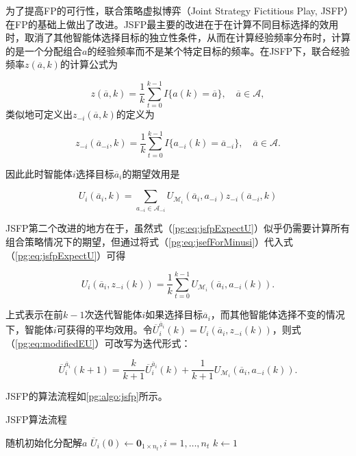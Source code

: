 为了提高FP的可行性，联合策略虚拟博弈（Joint Strategy Fictitious Play, JSFP）在FP的基础上做出了改进。JSFP最主要的改进在于在计算不同目标选择的效用时，取消了其他智能体选择目标的独立性条件，从而在计算经验频率分布时，计算的是一个分配组合$a$的经验频率而不是某个特定目标的频率。在JSFP下，联合经验频率$z(\overline a,k)$的计算公式为

\begin{equation}
\label{pg:eq:jsef}
	z(\overline a,k) = \frac{1}{k} \sum_{t=0}^{k-1} I\{a(k) = \overline a\},\quad \overline a \in \mathcal{A},
\end{equation}
类似地可定义出$z_{-i}(\overline a,k)$的定义为

\begin{equation}
\label{pg:eq:jsefForMinusi}
	z_{-i}(\overline a_{-i},k) = \frac{1}{k} \sum_{t=0}^{k-1} I\{a_{-i}(k) = \overline a_{-i}\},\quad \overline a \in \mathcal{A}.
\end{equation}

因此此时智能体$i$选择目标$\overline a_i$的期望效用是

\begin{equation}
\label{pg:eq:jsfpExpectU}
	U_i(\overline a_i,k) = \sum_{a_{-i} \in \mathcal{A}_{-i}} U_{\mathcal{M}_i}(\overline a_i,a_{-i}) z_{-i}(\overline a_{-i},k)
\end{equation}

JSFP第二个改进的地方在于，虽然式（\ref{pg:eq:jsfpExpectU}）似乎仍需要计算所有组合策略情况下的期望，但通过将式（\ref{pg:eq:jsefForMinusi}）代入式（\ref{pg:eq:jsfpExpectU}）可得

\begin{equation}
\label{pg:eq:modifiedEU}
	U_i(\overline a_i, z_{-i}(k)) = \frac{1}{k}\sum_{t=0}^{k-1} U_{\mathcal{M}_i}(\overline a_i, a_{-i}(k)).
\end{equation}

上式表示在前$k-1$次迭代智能体$i$如果选择目标$\overline a_i$，而其他智能体选择不变的情况下，智能体$i$可获得的平均效用。令$\overline U_i^{\overline a_i}(k)=U_i(\overline a_i, z_{-i}(k))$，则式（\ref{pg:eq:modifiedEU}）可改写为迭代形式：

\begin{equation}
\label{pg:eq:recurJSFP}
	\overline U_i^{\overline a_i}(k+1) = \frac{k}{k+1} \overline U_i^{\overline a_i}(k) + \frac{1}{k+1} U_{\mathcal{M}_i}(\overline a_i, a_{-i}(k)).
\end{equation}

JSFP的算法流程如\ref{pg:algo:jsfp}所示。

\begin{algorithm}[htb]
	\caption{JSFP算法流程}
	\label{pg:algo:jsfp}
	\small
	\SetAlgoLined
	随机初始化分配解$a$\;
	${\overline U}_i(0) \gets {\bm 0}_{1 \times n_t},i=1,\dots,n_t$\;
	$k \gets 1$\;
	
\end{algorithm}


